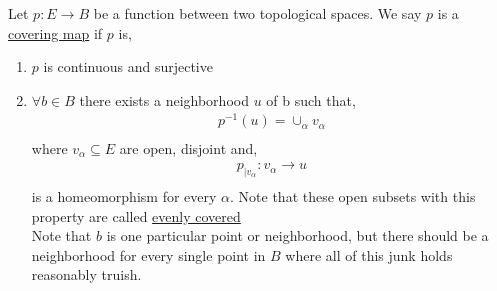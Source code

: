             \begin{definition} Let $p:E \rightarrow B$ be a function between two topological spaces. We say
                $p$ is a \underline{covering map} if $p$ is,
                \begin{enumerate}
                    \item $p$ is continuous and surjective
                    \item $\forall b\in B$ there exists a neighborhood $u$ of b such that,
                        \begin{align*}
                            p^{-1}(u)=\cup_{\alpha}v_{\alpha}\\
                        \end{align*}
                        where $v_\alpha\subseteq E$ are open, disjoint and,
                        \begin{align*}
                            p_{|v_{\alpha}}:v_{\alpha}\rightarrow u\\
                        \end{align*}
                        is a homeomorphism for every $\alpha$. Note that these open subsets with this property are called
                        \underline{evenly covered}\\
                        Note that $b$ is one particular point or neighborhood, but there should be a neighborhood for every single
                        point in $B$ where all of this junk holds reasonably truish.
                \end{enumerate}
            \end{definition}
